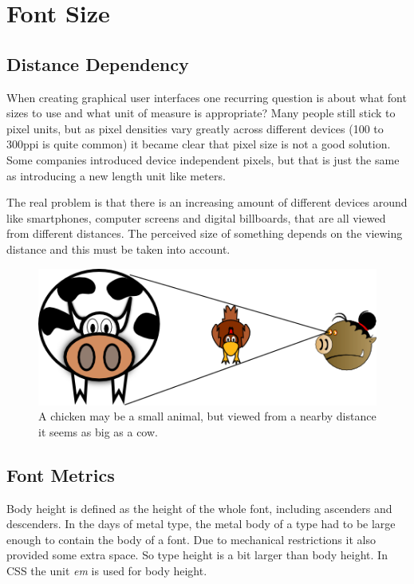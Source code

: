 \section{Font Size}

\subsection{Distance Dependency}

When creating graphical user interfaces one recurring question is about
what font sizes to use and what unit of measure is appropriate? Many
people still stick to pixel units, but as pixel densities vary greatly
across different devices (100 to 300ppi is quite common) it became clear
that pixel size is not a good solution. Some companies introduced device
independent pixels, but that is just the same as introducing a new
length unit like meters.

The real problem is that there is an increasing amount of different
devices around like smartphones, computer screens and digital
billboards, that are all viewed from different distances. The perceived
size of something depends on the viewing distance and this must be taken
into account.

\begin{figure}[ht]
\centering
\includegraphics[width=12cm]{img/viewingdistance.png}
\caption{A chicken may be a small animal, but viewed from a nearby
distance it seems as big as a cow. }
\end{figure}

\subsection{Font Metrics}

Body height is defined as the height of the whole font, including
ascenders and descenders. In the days of metal type, the metal body of a
type had to be large enough to contain the body of a font. Due to
mechanical restrictions it also provided some extra space. So type
height is a bit larger than body height. In CSS the unit \emph{em} is
used for body height.

